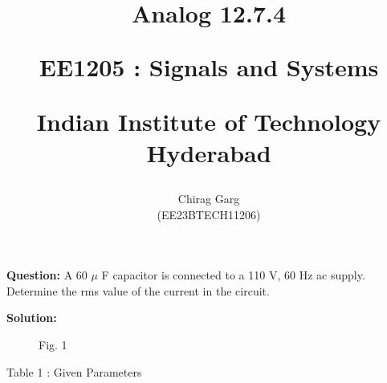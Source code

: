 \documentclass[journal,12pt,twocolumn]{IEEEtran}
\theoremstyle{remark}
\begin{document}
%






\title{
Analog 12.7.4

\large{EE1205 : Signals and Systems}

Indian Institute of Technology Hyderabad
}
\author{Chirag Garg

(EE23BTECH11206)
}	





\maketitle

\newpage



\bigskip

\renewcommand{\thefigure}{\theenumi}
\renewcommand{\thetable}{\theenumi}




\textbf{Question:} A 60 $\mu$ F capacitor is connected to a 110 V, 60 Hz ac supply. Determine
the rms value of the current in the circuit.


\textbf{Solution: }
\begin{figure}[!h]
 \centering
    
    \caption*{Fig. 1}
    \label{fig:enter-label}
\end{figure}
\begin{table}[htbp]
\centering
\resizebox{\columnwidth}{!}{
}

\caption*{Table 1 : Given Parameters}
\label{tab:my_label}
\end{table}
\end{document}
